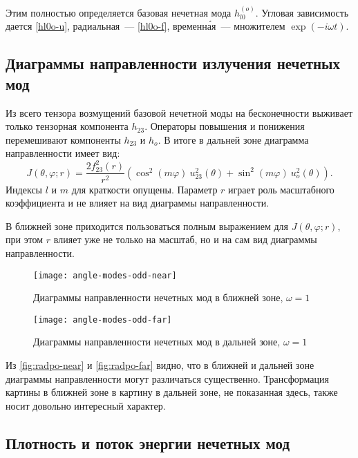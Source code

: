 \documentclass[\docroot/reports/draft/report.tex]{subfiles}
\begin{document}
    Этим полностью определяется базовая нечетная мода $h^{(o)}_{l0}$. Угловая зависимость дается \autoref{hl0o-u}, радиальная~--- \autoref{hl0o-f}, временн\'{а}я~--- множителем $\exp(-i \omega t)$.

\subsection{Диаграммы направленности излучения нечетных мод}

    Из всего тензора возмущений базовой нечетной моды на бесконечности выживает только тензорная компонента $h_{23}$. Операторы повышения и понижения перемешивают компоненты $h_{23}$ и $h_o$. В итоге в дальней зоне диаграмма направленности имеет вид:
    \begin{equation}\label{eq:radpo-far}
        J(\theta,\varphi;r) = \frac{2f^2_{23}(r)}{r^2} (\cos^2(m\varphi)\ u^2_{23}(\theta) + \sin^2(m\varphi)\ u^2_o(\theta)) .
    \end{equation}
    Индексы $l$ и $m$ для краткости опущены. Параметр $r$ играет роль масштабного коэффициента и не влияет на вид диаграммы направленности.

    В ближней зоне приходится пользоваться полным выражением для $J(\theta,\varphi;r)$, при этом $r$ влияет уже не только на масштаб, но и на сам вид диаграммы направленности.

    \begin{figure}[!htb]%
        \centering\texttt{[image: angle-modes-odd-near]}%
        \caption[]{Диаграммы направленности нечетных мод в ближней зоне, $\omega = 1$}%
        \label{fig:radpo-near}%
    \end{figure}

    \begin{figure}[!htb]%
        \centering\texttt{[image: angle-modes-odd-far]}%
        \caption[]{Диаграммы направленности нечетных мод в дальней зоне, $\omega = 1$}%
        \label{fig:radpo-far}%
    \end{figure}

    Из \autoref{fig:radpo-near} и \autoref{fig:radpo-far} видно, что в ближней и дальней зоне диаграммы направленности могут различаться существенно. Трансформация картины в ближней зоне в картину в дальней зоне, не показанная здесь, также носит довольно интересный характер.

\subsection{Плотность и поток энергии нечетных мод}
\end{document}
